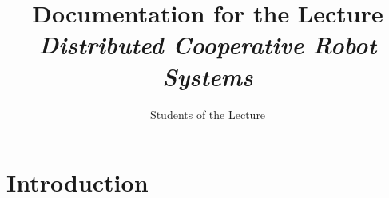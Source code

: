 \documentclass[a4paper,10pt]{scrreprt}
\title{Documentation for the Lecture \emph{Distributed Cooperative Robot Systems}}
\author{Students of the Lecture}
\begin{document}
\maketitle
\tableofcontents

\chapter{Introduction}
\label{chap:Introduction}












\end{document}
